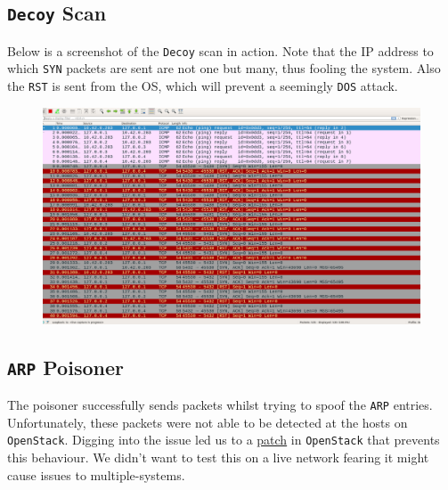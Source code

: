 \documentclass[12pt]{article}
\newcommand{\pbreak}{\vspace{4mm}}
\begin{document}
\subsection{\texttt{Decoy} Scan}
Below is a screenshot of the \texttt{Decoy} scan in action. Note that the IP address to which \texttt{SYN} packets are sent are not one but many, thus fooling the system. Also the \texttt{RST} is sent from the OS, which will prevent a seemingly \texttt{DOS} attack.

\begin{figure}[H]
    \centering
    \includegraphics[width=0.75\linewidth]{decoy.png}
\end{figure}

\subsection{\texttt{ARP} Poisoner}
The poisoner successfully sends packets whilst trying to spoof the \texttt{ARP} entries. Unfortunately, these packets were not able to be detected at the hosts on \texttt{OpenStack}. Digging into the issue led us to a \href{https://specs.openstack.org/openstack/neutron-specs/specs/kilo/arp-spoof-filtering-ebtables.html}{patch} in \texttt{OpenStack} that prevents this behaviour. We didn't want to test this on a live network fearing it might cause issues to multiple-systems.
\pbreak
\end{document}
